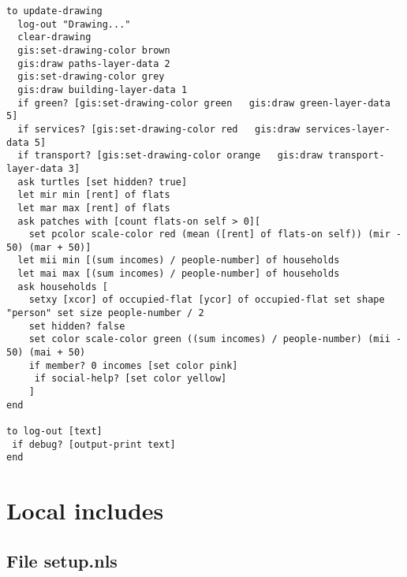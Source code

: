 \documentclass[english]{article}
\begin{document}
\begin{lstlisting}[basicstyle={\scriptsize}]
to update-drawing
  log-out "Drawing..."
  clear-drawing
  gis:set-drawing-color brown
  gis:draw paths-layer-data 2
  gis:set-drawing-color grey
  gis:draw building-layer-data 1
  if green? [gis:set-drawing-color green   gis:draw green-layer-data 5]
  if services? [gis:set-drawing-color red   gis:draw services-layer-data 5]
  if transport? [gis:set-drawing-color orange   gis:draw transport-layer-data 3] 
  ask turtles [set hidden? true] 
  let mir min [rent] of flats
  let mar max [rent] of flats
  ask patches with [count flats-on self > 0][
    set pcolor scale-color red (mean ([rent] of flats-on self)) (mir - 50) (mar + 50)]
  let mii min [(sum incomes) / people-number] of households
  let mai max [(sum incomes) / people-number] of households 
  ask households [
    setxy [xcor] of occupied-flat [ycor] of occupied-flat set shape "person" set size people-number / 2 
    set hidden? false
    set color scale-color green ((sum incomes) / people-number) (mii - 50) (mai + 50)
    if member? 0 incomes [set color pink]
     if social-help? [set color yellow]
    ]
end

to log-out [text] 
 if debug? [output-print text]
end
\end{lstlisting}





\section*{Local includes}


\subsection*{File setup.nls}
\end{document}
